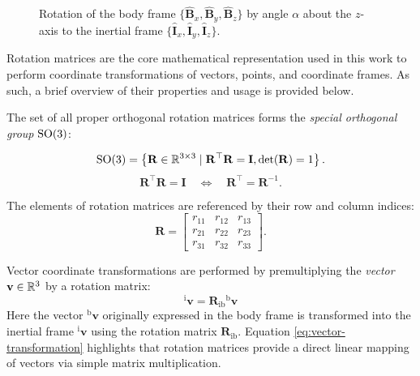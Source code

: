 \begin{figure}[htbp]
	\centering
	
	\caption{Rotation of the body frame $\{\hat{\mathbf{B}}_x, \hat{\mathbf{B}}_y, \hat{\mathbf{B}}_z\}$ by angle $\alpha$ about the $z$-axis to the inertial frame $\{\hat{\mathbf{I}}_x, \hat{\mathbf{I}}_y, \hat{\mathbf{I}}_z\}$.}
    \label{fig:dcm-2d}
\end{figure}

Rotation matrices are the core mathematical representation used in this work to perform coordinate transformations of vectors, points, and coordinate frames. 
As such, a brief overview of their properties and usage is provided below.

The set of all proper orthogonal rotation matrices forms the \emph{special orthogonal group} \(\mathrm{SO}(3)\):

\begin{equation}
\mathrm{SO}(3) = \left\{ \mathbf{R} \in \mathbb{R}^{3 \times 3} \mid \mathbf{R}^\top \mathbf{R} = \mathbf{I}, \det(\mathbf{R}) = 1 \right\}.
\label{eq:so3-definition}
\end{equation}
\begin{equation}
\mathbf{R}^\top \mathbf{R} = \mathbf{I}
\quad \Longleftrightarrow \quad
\mathbf{R}^\top = \mathbf{R}^{-1}.
\label{eq:orthogonal-inverse}
\end{equation}

The elements of rotation matrices are referenced by their row and column indices:
\begin{equation}
\mathbf{R} = 
\begin{bmatrix}
r_{11} & r_{12} & r_{13} \\
r_{21} & r_{22} & r_{23} \\
r_{31} & r_{32} & r_{33}
\end{bmatrix}.
\label{eq:rotation-matrix-elements}
\end{equation}

Vector coordinate transformations are performed by premultiplying the \emph{vector} \(\mathbf{v} \in \mathbb{R}^3\) by a rotation matrix:
\begin{equation}
    {}^{\text{i}}\mathbf{v} = \mathbf{R}_{\text{ib}} {}^{\text{b}}\mathbf{v}
\label{eq:vector-transformation}
\end{equation}
Here the vector \({}^{\text{b}}\mathbf{v}\) originally expressed in the body frame is transformed into the inertial frame \({}^{\text{i}}\mathbf{v}\) using the rotation matrix \(\mathbf{R}_{\text{ib}}\).
Equation \cref{eq:vector-transformation} highlights that rotation matrices provide a direct linear mapping of vectors via simple matrix multiplication.

